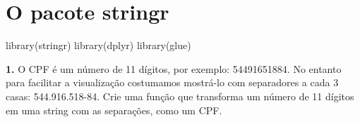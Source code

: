 \documentclass[
]{book}
\newenvironment{Shaded}{\begin{snugshade}}{\end{snugshade}}
\newcommand{\FunctionTok}[1]{\textcolor[rgb]{0.00,0.00,0.00}{#1}}
\newcommand{\NormalTok}[1]{#1}
\begin{document}
\hypertarget{o-pacote-stringr-1}{%
\section{O pacote stringr}\label{o-pacote-stringr-1}}

\begin{Shaded}
\begin{Highlighting}[]
\FunctionTok{library}\NormalTok{(stringr)}
\FunctionTok{library}\NormalTok{(dplyr)}
\FunctionTok{library}\NormalTok{(glue)}
\end{Highlighting}
\end{Shaded}

\textbf{1.} O CPF é um número de 11 dígitos, por exemplo: 54491651884. No entanto para facilitar a visualização costumamos mostrá-lo com separadores a cada 3 casas: 544.916.518-84. Crie uma função que transforma um número de 11 dígitos em uma string com as separações, como um CPF.
\end{document}
